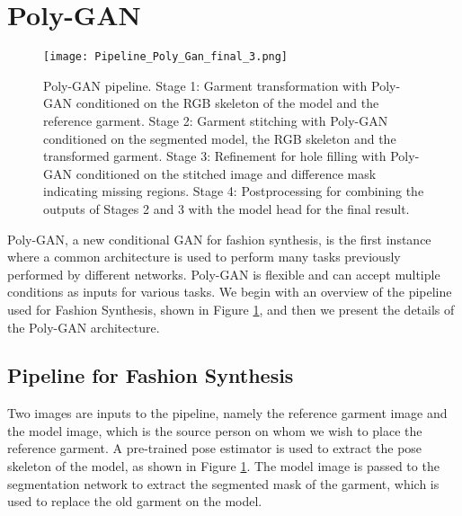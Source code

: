 \documentclass[11pt]{article}
\begin{document}
\section{Poly-GAN}
\label{headings2}
\begin{figure}
\centering
  \texttt{[image: Pipeline\_Poly\_Gan\_final\_3.png]}
  \caption{Poly-GAN pipeline. Stage 1: Garment transformation with Poly-GAN conditioned on the RGB skeleton of the model and the reference garment. Stage 2: Garment stitching with Poly-GAN conditioned on the segmented model, the RGB skeleton and the transformed garment. Stage 3: Refinement for hole filling with Poly-GAN conditioned on the stitched image and difference mask indicating missing regions. Stage 4: Postprocessing  for combining the outputs of Stages 2 and 3 with the model head for the final result.}
  \label{fig:2}
\end{figure}
Poly-GAN, a new conditional GAN for fashion synthesis, is the first instance where a common architecture is used to perform many tasks previously performed by different networks. Poly-GAN is flexible and can accept multiple conditions as inputs for various tasks. We begin with an overview of the pipeline used for Fashion Synthesis, shown in Figure \ref{fig:2}, and then we present the details of the Poly-GAN architecture. 
\subsection{Pipeline for Fashion Synthesis}
Two images are inputs to the pipeline, namely the reference garment image and the model image, which is the source person on whom we wish to place the reference garment. 
A pre-trained pose estimator is used to extract the pose skeleton of the model, as shown in Figure \ref{fig:2}. The model image is passed to the segmentation network to extract the segmented mask of the garment, which is used to replace the old garment on the model.
\end{document}
